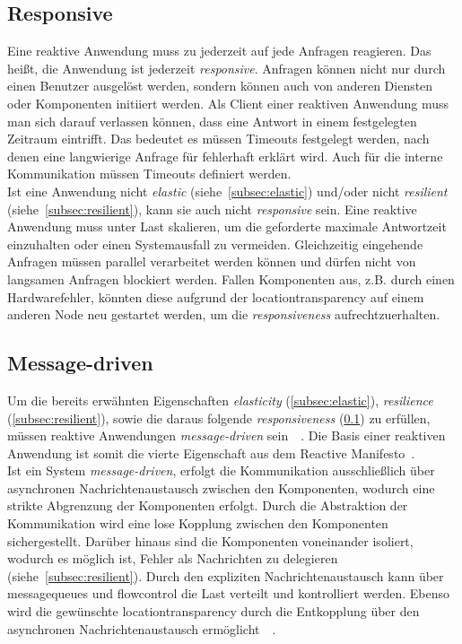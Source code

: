 \subsection{Responsive}\label{subsec:responsive}
Eine reaktive Anwendung muss zu jederzeit auf jede Anfragen reagieren. Das heißt, die Anwendung ist jederzeit \textit{responsive}. Anfragen können nicht nur durch einen Benutzer ausgelöst werden, sondern können auch von anderen Diensten oder Komponenten initiiert werden. Als Client einer reaktiven Anwendung muss man sich darauf verlassen können, dass eine Antwort in einem festgelegten Zeitraum eintrifft. Das bedeutet es müssen Timeouts festgelegt werden, nach denen eine langwierige Anfrage für fehlerhaft erklärt wird. Auch für die interne Kommunikation müssen Timeouts definiert werden.\\
Ist eine Anwendung nicht \textit{elastic} (siehe~\ref{subsec:elastic}) und/oder nicht \textit{resilient} (siehe~\ref{subsec:resilient}), kann sie auch nicht \textit{responsive} sein. Eine reaktive Anwendung muss unter Last skalieren, um die geforderte maximale Antwortzeit einzuhalten oder einen Systemausfall zu vermeiden. Gleichzeitig eingehende Anfragen müssen parallel verarbeitet werden können und dürfen nicht von langsamen Anfragen blockiert werden. Fallen Komponenten aus, z.B. durch einen Hardwarefehler, könnten diese aufgrund der \gls{locationtransparency} auf einem anderen Node neu gestartet werden, um die \textit{responsiveness} aufrechtzuerhalten.

\pagebreak

\subsection{Message-driven}\label{subsec:messagedriven}
Um die bereits erwähnten Eigenschaften \textit{elasticity} (\ref{subsec:elastic}), \textit{resilience} (\ref{subsec:resilient}), sowie die daraus folgende \textit{responsiveness} (\ref{subsec:responsive}) zu erfüllen, müssen reaktive Anwendungen \textit{message-driven} sein~\cite{webber_what_2014}~\cite[S.~43]{kuhn_reactive_2015}. Die Basis einer reaktiven Anwendung ist somit die vierte Eigenschaft aus dem Reactive Manifesto~\cite{boner_reactive_2014}.\\
Ist ein System \textit{message-driven}, erfolgt die Kommunikation ausschließlich über asynchronen Nachrichtenaustausch zwischen den Komponenten, wodurch eine strikte Abgrenzung der Komponenten erfolgt. Durch die Abstraktion der Kommunikation wird eine lose Kopplung zwischen den Komponenten sichergestellt. Darüber hinaus sind die Komponenten voneinander isoliert, wodurch es möglich ist, Fehler als Nachrichten zu delegieren (siehe~\ref{subsec:resilient}). Durch den expliziten Nachrichtenaustausch kann über \glspl{messagequeue} und \gls{flowcontrol} die Last verteilt und kontrolliert werden. Ebenso wird die gewünschte \gls{locationtransparency} durch die Entkopplung über den asynchronen Nachrichtenaustausch ermöglicht~\cite{boner_reactive_2015}~\cite[S.~43]{kuhn_reactive_2015}.\\

